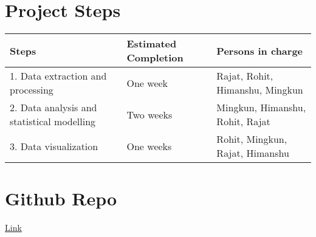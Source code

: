 \documentclass[a4paper]{article}
\begin{document}
\section{Project Steps}
\begin{center}
\begin{tabular}{|l|l|l|}
    \hline
Steps & Estimated Completion & Persons in charge \\
\hline
1. Data extraction and processing & One week & Rajat, Rohit, Himanshu, Mingkun \\
2. Data analysis and statistical modelling & Two weeks & Mingkun, Himanshu, Rohit, Rajat \\
3. Data visualization & One weeks & Rohit, Mingkun, Rajat, Himanshu\\
\hline
\end{tabular}
\end{center}

\section{Github Repo}
\href{https://github.com/rohit1347/ece143_g3}{Link}
\end{document}
